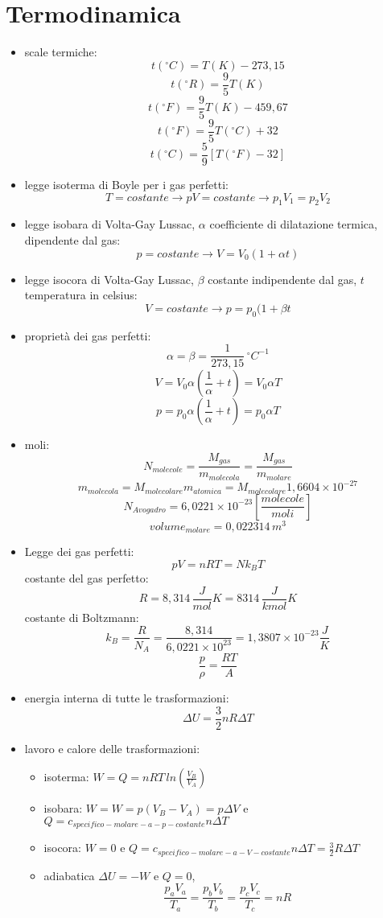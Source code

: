 \documentclass[a4paper,12pt, oneside]{book}
\begin{document}
\section{Termodinamica}
\begin{itemize}
\item scale termiche:
$$t(^{\circ}C)=T(K)-273,15$$
$$t(^{\circ}R)=\frac{9}{5} T(K)$$
$$t(^{\circ}F)=\frac{9}{5} T(K)-459,67$$
$$t(^{\circ}F)=\frac{9}{5} T(^{\circ}C)+32$$
$$t(^{\circ}C)=\frac{5}{9} [T(^{\circ}F)-32]$$
\item legge isoterma di Boyle per i gas perfetti:
$$T=costante\to pV=costante\to p_1V_1=p_2V_2$$
\item legge isobara di Volta-Gay Lussac, $\alpha$ coefficiente di dilatazione termica, dipendente dal gas:
$$p=costante\to V=V_0(1+\alpha t)$$
\item legge isocora di Volta-Gay Lussac, $\beta$ costante indipendente dal gas, $t$ temperatura in celsius:
$$V=costante\to p=p_0(1+\beta t$$
\item proprietà dei gas perfetti:
$$\alpha=\beta=\frac{1}{273,15} {\,}^\circ C^{-1}$$
$$V=V_0\alpha\left(\frac{1}{\alpha}+t\right)=V_0\alpha T$$
$$p=p_0\alpha\left(\frac{1}{\alpha}+t\right)=p_0\alpha T$$
\item moli:
$$N_{molecole}=\frac{M_{gas}}{m_{molecola}}=\frac{M_{gas}}{m_{molare}}$$
$$m_{molecola}=M_{molecolare}m_{atomica}=M_{molecolare}1,6604\times 10^{-27}$$
$$N_{Avogadro}=6,0221\times 10^{-23}\left[\frac{molecole}{moli}\right]$$
$$volume_{molare}=0,022314\,m^3$$
\item Legge dei gas perfetti:
$$pV=nRT=Nk_BT$$
costante del gas perfetto:
$$R=8,314\,\frac{J}{mol}K=8314\,\frac{J}{kmol}K$$
costante di Boltzmann:
$$k_B=\frac{R}{N_A}=\frac{8,314}{6,0221\times 10^{23}}=1,3807\times 10^{-23}\frac{J}{K}$$
$$\frac{p}{\rho}=\frac{RT}{A}$$
\item energia interna di tutte le trasformazioni:
$$\Delta U=\frac{3}{2}nR\Delta T$$
\item lavoro e calore delle trasformazioni:
\begin{itemize}
\item isoterma: $W=Q=nRT\,ln\left(\frac{V_B}{V_A}\right)$
\item isobara: $W=W=p(V_B-V_A)=p\Delta V$ e
				$Q=c_{specifico-molare-a-p-costante}n\Delta T$
\item isocora: $W=0$ e $Q=c_{specifico-molare-a-V-costante}n\Delta T=\frac{3}{2}R\Delta T$
\item adiabatica $\Delta U=-W$ e $Q=0$, $$\frac{p_aV_a}{T_a}=\frac{p_bV_b}{T_b}=\frac{p_cV_c}{T_c}=nR$$

\end{itemize}
\end{itemize}
\end{document}
